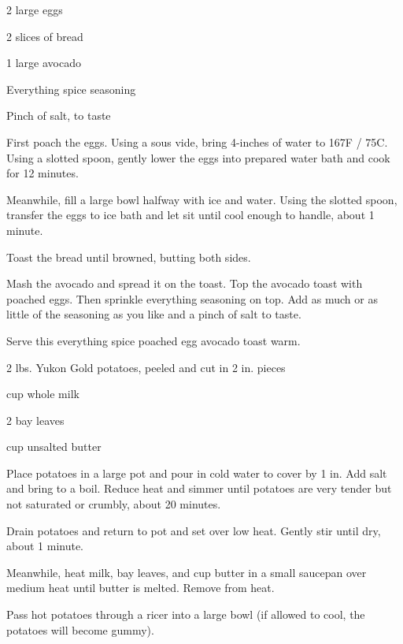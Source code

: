 \documentclass{cookbook}
\begin{document}
\begin{ingredients}
    \item 2 large eggs
    \item 2 slices of bread
    \item 1 large avocado
    \item Everything spice seasoning
    \item Pinch of salt, to taste
\end{ingredients}

First poach the eggs. Using a sous vide, bring 4-inches of water to 167\degree F / 75\degree C. Using a slotted spoon, gently lower the eggs into prepared water bath and cook for 12 minutes.

Meanwhile, fill a large bowl halfway with ice and water. Using the slotted spoon, transfer the eggs to ice bath and let sit until cool enough to handle, about 1 minute.

Toast the bread until browned, butting both sides.

Mash the avocado and spread it on the toast. Top the avocado toast with poached eggs. Then sprinkle everything seasoning on top. Add as much or as little of the seasoning as you like and a pinch of salt to taste.

Serve this everything spice poached egg avocado toast warm.


\begin{ingredients}
    \item 2 lbs. Yukon Gold potatoes, peeled and cut in 2 in. pieces
    \item {} cup whole milk
    \item 2 bay leaves
    \item {} cup unsalted butter
\end{ingredients}

Place potatoes in a large pot and pour in cold water to cover by 1 in. Add salt and bring to a boil. Reduce heat and simmer until potatoes are very tender but not saturated or crumbly, about 20 minutes.

Drain potatoes and return to pot and set over low heat. Gently stir until dry, about 1 minute.

Meanwhile, heat milk, bay leaves, and  cup butter in a small saucepan over medium heat until butter is melted. Remove from heat.

Pass hot potatoes through a ricer into a large bowl (if allowed to cool, the potatoes will become gummy).
\end{document}
